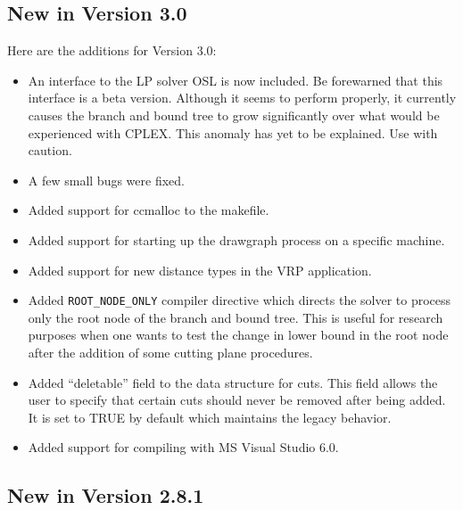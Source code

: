 
\subsection{New in Version 3.0}

Here are the additions for Version 3.0:

\begin{itemize}

\item An interface to the LP solver OSL is now included. Be forewarned
that this interface is a beta version. Although it seems to perform
properly, it currently causes the branch and bound tree to grow
significantly over what would be experienced with CPLEX. This anomaly
has yet to be explained. Use with caution. 

\item A few small bugs were fixed.

\item Added support for ccmalloc to the makefile.

\item Added support for starting up the drawgraph process on a specific
machine. 

\item Added support for new distance types in the VRP application.

\item Added {\tt ROOT\_NODE\_ONLY} compiler directive which directs
the solver to process only the root node of the branch and bound tree.
This is useful for research purposes when one wants to test the change
in lower bound in the root node after the addition of some cutting
plane procedures.

\item Added ``deletable'' field to the data structure for cuts. This field
allows the user to specify that certain cuts should never be removed
after being added. It is set to TRUE by default which maintains the
legacy behavior.

\item Added support for compiling with MS Visual Studio 6.0.

\end{itemize}

\subsection{New in Version 2.8.1}

